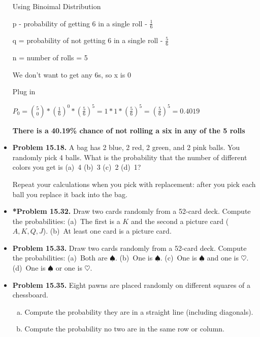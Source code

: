 \documentclass[11pt]{article}
\begin{document}
\begin{itemize}
Using Binoimal Distribution

p - probability of getting 6 in a single roll - $\frac{1}{6}$

q = probability of not getting 6 in a single roll - $\frac{5}{6}$

n = number of rolls = 5

We don't want to get any 6s, so x is 0

Plug in

$P_0 = \binom{5}{0} * (\frac{1}{6})^0*(\frac{5}{6})^5 = 1 * 1 * (\frac{5}{6})^5 = (\frac{5}{6})^5 = 0.4019$

\textbf{There is a 40.19\% chance of not rolling a six in any of the 5 rolls}




\vspace{0.2in}

\item \textbf{Problem 15.18.}
A bag has 2 blue, 2 red, 2 green, and 2 pink balls.
You randomly pick 4 balls.
What is the probability that the number of different colors you get is (a)~4 (b)~3 (c)~2 (d)~1?

Repeat your calculations when you pick with replacement: after you pick each ball you
replace it back into the bag.

\vspace{0.2in}

\item \textbf{*Problem 15.32.}
Draw two cards randomly from a 52-card deck.
Compute the probabilities:
(a)~The first is a $K$ and the second a picture card ($A,K,Q,J$).
(b)~At least one card is a picture card.

\vspace{0.2in}

\item \textbf{Problem 15.33.}
Draw two cards randomly from a 52-card deck.
Compute the probabilities:
(a)~Both are $\spadesuit$.
(b)~One is $\spadesuit$.
(c)~One is $\spadesuit$ and one is $\heartsuit$.
(d)~One is $\spadesuit$ or one is $\heartsuit$.

\newpage

\item \textbf{Problem 15.35.}
Eight pawns are placed randomly on different squares of a chessboard.
\begin{enumerate}[(a)]
\item Compute the probability they are in a straight line (including diagonals).
\item Compute the probability no two are in the same row or column.
\end{enumerate}


\end{itemize}
\end{document}
